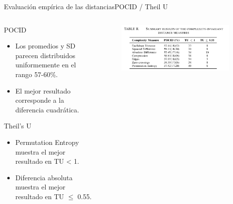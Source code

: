 \documentclass[12pt, aspectratio=169]{beamer} %
\begin{document}
\begin{frame}{Evaluación empírica de las distancias}{POCID / Theil U}

  \begin{columns}
    \begin{column}{0.6\textwidth}
      \begin{block}{POCID}
        \begin{itemize}
        \item Los promedios y SD parecen distribuidos uniformemente en el rango 57-60\%.
        \item El mejor resultado corresponde a la diferencia cuadrática.
        \end{itemize}
      \end{block}
      \begin{block}{Theil's U}
        \begin{itemize}
        \item Permutation Entropy muestra el mejor resultado en TU < 1.
          \item Diferencia absoluta muestra el mejor resultado en TU $\leq$ 0.55.
        \end{itemize}
      \end{block}
    \end{column}
    \begin{column}{0.4\textwidth}
      \begin{figure}
        \includegraphics[width=\textwidth]{20210313_5_tabla_cid.png}
      \end{figure}
    \end{column}

  \end{columns}
  
\end{frame}
\end{document}
